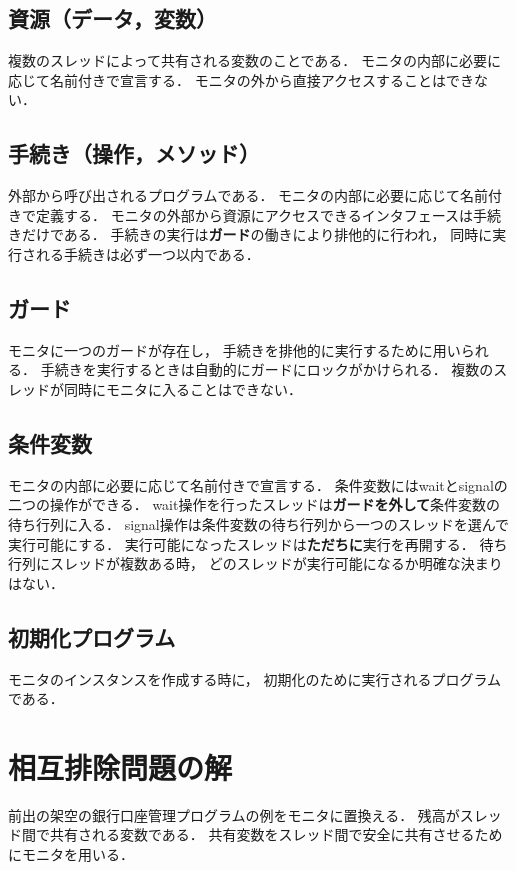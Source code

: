 
\subsection{資源（データ，変数）}
複数のスレッドによって共有される変数のことである．
モニタの内部に必要に応じて名前付きで宣言する．
モニタの外から直接アクセスすることはできない．

\subsection{手続き（操作，メソッド）}
外部から呼び出されるプログラムである．
モニタの内部に必要に応じて名前付きで定義する．
モニタの外部から資源にアクセスできるインタフェースは手続きだけである．
手続きの実行は{\bf ガード}の働きにより排他的に行われ，
同時に実行される手続きは必ず一つ以内である．

\subsection{ガード}
モニタに一つのガードが存在し，
手続きを排他的に実行するために用いられる．
手続きを実行するときは自動的にガードにロックがかけられる．
複数のスレッドが同時にモニタに入ることはできない．

\subsection{条件変数}
モニタの内部に必要に応じて名前付きで宣言する．
条件変数にはwaitとsignalの二つの操作ができる．
wait操作を行ったスレッドは{\bf ガードを外して}条件変数の待ち行列に入る．
signal操作は条件変数の待ち行列から一つのスレッドを選んで実行可能にする．
実行可能になったスレッドは{\bf ただちに}実行を再開する．
待ち行列にスレッドが複数ある時，
どのスレッドが実行可能になるか明確な決まりはない．

\subsection{初期化プログラム}
モニタのインスタンスを作成する時に，
初期化のために実行されるプログラムである．

\section{相互排除問題の解}
前出の架空の銀行口座管理プログラムの例をモニタに置換える．
残高がスレッド間で共有される変数である．
共有変数をスレッド間で安全に共有させるためにモニタを用いる．

